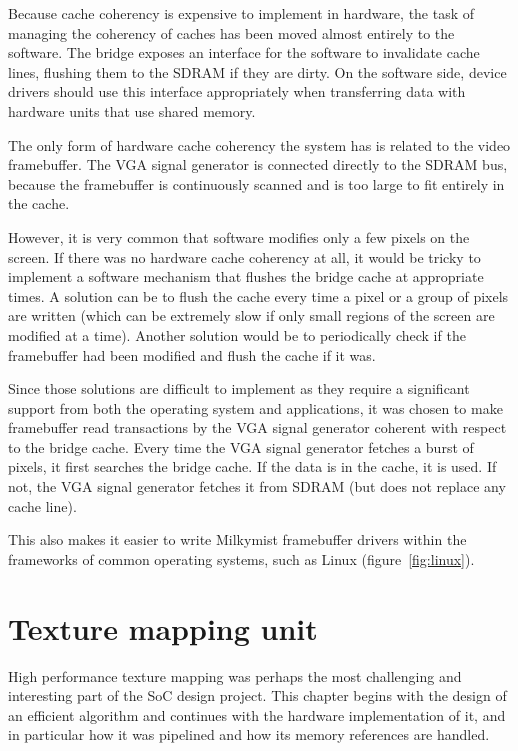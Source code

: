 \documentclass[a4paper,11pt]{kthesis}
\begin{document}
Because cache coherency is expensive to implement in hardware, the task of managing the coherency of caches has been moved almost entirely to the software. The bridge exposes an interface for the software to invalidate cache lines, flushing them to the SDRAM if they are dirty. On the software side, device drivers should use this interface appropriately when transferring data with hardware units that use shared memory.

The only form of hardware cache coherency the system has is related to the video framebuffer. The VGA signal generator is connected directly to the SDRAM bus, because the framebuffer is continuously scanned and is too large to fit entirely in the cache.

However, it is very common that software modifies only a few pixels on the screen. If there was no hardware cache coherency at all, it would be tricky to implement a software mechanism that flushes the bridge cache at appropriate times. A solution can be to flush the cache every time a pixel or a group of pixels are written (which can be extremely slow if only small regions of the screen are modified at a time). Another solution would be to periodically check if the framebuffer had been modified and flush the cache if it was.

Since those solutions are difficult to implement as they require a significant support from both the operating system and applications, it was chosen to make framebuffer read transactions by the VGA signal generator coherent with respect to the bridge cache. Every time the VGA signal generator fetches a burst of pixels, it first searches the bridge cache. If the data is in the cache, it is used. If not, the VGA signal generator fetches it from SDRAM (but does not replace any cache line).

This also makes it easier to write Milkymist framebuffer drivers within the frameworks of common operating systems, such as Linux (figure~\ref{fig:linux}).

\chapter{Texture mapping unit}
\label{ch:tmu}
High performance texture mapping was perhaps the most challenging and interesting part of the SoC design project. This chapter begins with the design of an efficient algorithm and continues with the hardware implementation of it, and in particular how it was pipelined and how its memory references are handled.
\end{document}
